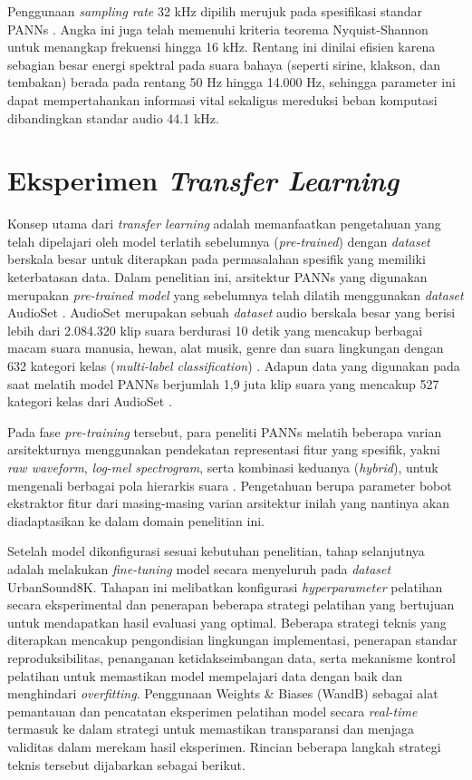 Penggunaan \textit{sampling rate} 32 kHz dipilih merujuk pada spesifikasi standar PANNs \cite{kong2020panns}. 
Angka ini juga telah memenuhi kriteria teorema Nyquist-Shannon untuk menangkap frekuensi hingga 16 kHz.
Rentang ini dinilai efisien karena sebagian besar energi spektral pada suara bahaya (seperti sirine, klakson, dan tembakan) berada pada rentang 50 Hz hingga 14.000 Hz, sehingga parameter ini dapat mempertahankan informasi vital sekaligus mereduksi beban komputasi dibandingkan standar audio 44.1 kHz.

\section{Eksperimen \textit{Transfer Learning}} \label{sec:eksperimen}
Konsep utama dari \textit{transfer learning} adalah memanfaatkan pengetahuan yang telah dipelajari oleh model terlatih sebelumnya (\textit{pre-trained}) dengan \textit{dataset} berskala besar untuk diterapkan pada permasalahan spesifik yang memiliki keterbatasan data.
Dalam penelitian ini, arsitektur PANNs yang digunakan merupakan \textit{pre-trained model} yang sebelumnya telah dilatih menggunakan \textit{dataset} AudioSet \cite{kong2020panns}.
AudioSet merupakan sebuah \textit{dataset} audio berskala besar yang berisi lebih dari 2.084.320 klip suara berdurasi 10 detik yang mencakup berbagai macam suara manusia, hewan, alat musik, genre dan suara lingkungan dengan 632 kategori kelas (\textit{multi-label classification}) \cite{gemmeke2017audioset}.
Adapun data yang digunakan pada saat melatih model PANNs berjumlah 1,9 juta klip suara yang mencakup 527 kategori kelas dari AudioSet \cite{kong2020panns}. \par

Pada fase \textit{pre-training} tersebut, para peneliti PANNs melatih beberapa varian arsitekturnya menggunakan pendekatan representasi fitur yang spesifik, yakni \textit{raw waveform}, \textit{log-mel spectrogram}, serta kombinasi keduanya (\textit{hybrid}), untuk mengenali berbagai pola hierarkis suara \cite{kong2020panns}.
Pengetahuan berupa parameter bobot ekstraktor fitur dari masing-masing varian arsitektur inilah yang nantinya akan diadaptasikan ke dalam domain penelitian ini. \par

Setelah model dikonfigurasi sesuai kebutuhan penelitian, tahap selanjutnya adalah melakukan \textit{fine-tuning} model secara menyeluruh pada \textit{dataset} UrbanSound8K.
Tahapan ini melibatkan konfigurasi \textit{hyperparameter} pelatihan secara eksperimental dan penerapan beberapa strategi pelatihan yang bertujuan untuk mendapatkan hasil evaluasi yang optimal.
Beberapa strategi teknis yang diterapkan mencakup pengondisian lingkungan implementasi, penerapan standar reproduksibilitas, penanganan ketidakseimbangan data, serta mekanisme kontrol pelatihan untuk memastikan model mempelajari data dengan baik dan menghindari \textit{overfitting}.
Penggunaan Weights \& Biases (WandB) sebagai alat pemantauan dan pencatatan eksperimen pelatihan model secara \textit{real-time} termasuk ke dalam strategi untuk memastikan transparansi dan menjaga validitas dalam merekam hasil eksperimen.
Rincian beberapa langkah strategi teknis tersebut dijabarkan sebagai berikut.

